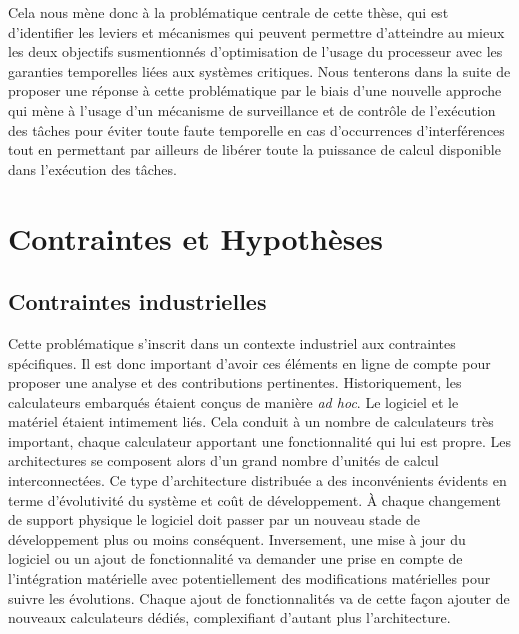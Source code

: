 \documentclass[french, a4paper, 11pt, twoside, pdftex]{StyleThese}
\begin{document}
		Cela nous mène donc à la problématique centrale de cette thèse, qui est d'identifier les leviers et mécanismes qui peuvent permettre d'atteindre au mieux les deux objectifs susmentionnés d'optimisation de l'usage du processeur avec les garanties temporelles liées aux systèmes critiques. 
		Nous tenterons dans la suite de proposer une réponse à cette problématique par le biais d'une nouvelle approche qui mène à l'usage d'un mécanisme de surveillance et de contrôle de l'exécution des tâches pour éviter toute faute temporelle en cas d'occurrences d'interférences tout en permettant par ailleurs de libérer toute la puissance de calcul disponible dans l'exécution des tâches.
	

\section{Contraintes et Hypothèses}
		
	\subsection{Contraintes industrielles}
		Cette problématique s'inscrit dans un contexte industriel aux contraintes spécifiques. Il est donc important d'avoir ces éléments en ligne de compte pour proposer une analyse et des contributions pertinentes. Historiquement, les calculateurs embarqués étaient conçus de manière \emph{ad hoc}. Le logiciel et le matériel étaient intimement liés. Cela conduit à un nombre de calculateurs très important, chaque calculateur apportant une fonctionnalité qui lui est propre. Les architectures se composent alors d'un grand nombre d'unités de calcul interconnectées. 
		Ce type d'architecture distribuée a des inconvénients évidents en terme d'évolutivité du système et coût de développement. À chaque changement de support physique le logiciel doit passer par un nouveau stade de développement plus ou moins conséquent. Inversement, une mise à jour du logiciel ou un ajout de fonctionnalité va demander une prise en compte de l'intégration matérielle avec potentiellement des modifications matérielles pour suivre les évolutions. Chaque ajout de fonctionnalités va de cette façon ajouter de nouveaux calculateurs dédiés, complexifiant d'autant plus l'architecture.
		
\end{document}
